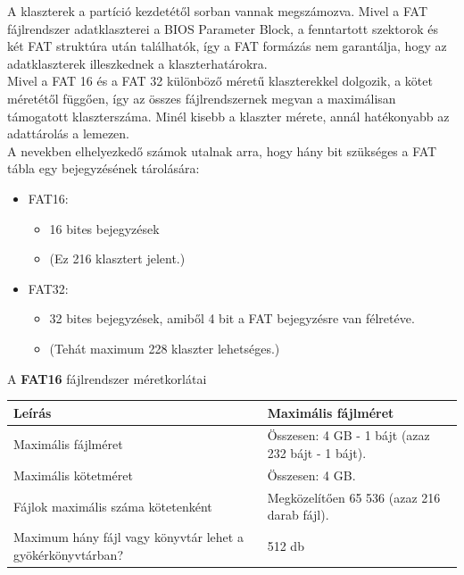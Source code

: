 \documentclass[tikz,12pt,margin=0px]{article}
\begin{document}
    \noindent A klaszterek a partíció kezdetétől sorban vannak megszámozva. Mivel a FAT fájlrendszer adatklaszterei a BIOS Parameter Block, a fenntartott szektorok és két FAT struktúra után találhatók, így a FAT formázás nem garantálja, hogy az adatklaszterek illeszkednek a klaszterhatárokra.\\

    \noindent Mivel a FAT 16 és a FAT 32 különböző méretű klaszterekkel dolgozik, a kötet méretétől függően, így az összes fájlrendszernek megvan a maximálisan támogatott klaszterszáma. Minél kisebb a klaszter mérete, annál hatékonyabb az adattárolás a lemezen.\\

    \noindent A nevekben elhelyezkedő számok utalnak arra, hogy hány bit szükséges a FAT tábla egy bejegyzésének tárolására:
    \begin{itemize}[topsep=8pt,itemsep=4pt,partopsep=4pt, parsep=4pt]
        \item FAT16:
        \begin{itemize}
            \item 16 bites bejegyzések
            \item (Ez 216 klasztert jelent.)
        \end{itemize}
        \item FAT32:
        \begin{itemize}
            \item 32 bites bejegyzések, amiből 4 bit a FAT bejegyzésre van félretéve.
            \item (Tehát maximum 228 klaszter lehetséges.)\\
        \end{itemize}
    \end{itemize}

    \noindent A \textbf{FAT16} fájlrendszer méretkorlátai\\

    \noindent \renewcommand{\arraystretch}{2}
    {\footnotesize
      \begin{tabular}{|p{6cm}|p{9cm}|} \hline
      Leírás & Maximális fájlméret \\ \hline \hline
      Maximális fájlméret & Összesen: 4 GB - 1 bájt (azaz 232 bájt - 1 bájt). \\ \hline
      Maximális kötetméret & Összesen: 4 GB. \\ \hline
      Fájlok maximális száma kötetenként & Megközelítően 65 536 (azaz 216 darab fájl). \\ \hline
      Maximum hány fájl vagy könyvtár lehet a gyökérkönyvtárban? & 512 db \\ \hline
      \end{tabular}\\
    }
    \renewcommand{\arraystretch}{1}\\
\end{document}
